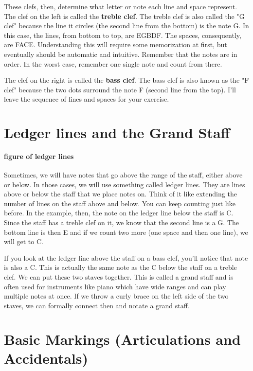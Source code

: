 \documentclass[../OpenAppliedMusicTheory.tex]{subfiles}
\begin{document}
        These clefs, then, determine what letter or note each line and space represent. The clef on the left is called the \textbf{treble clef}. The treble clef is also called the "G clef" because the line it circles (the second line from the bottom) is the note G. In this case, the lines, from bottom to top, are EGBDF. The spaces, consequently, are FACE. Understanding this will require some memorization at first, but eventually should be automatic and intuitive. Remember that the notes are in order. In the worst case, remember one single note and count from there.

        The clef on the right is called the \textbf{bass clef}. The bass clef is also known as the "F clef" because the two dots surround the note F (second line from the top). I'll leave the sequence of lines and spaces for your exercise. 

    \section{Ledger lines and the Grand Staff}\label{ch1.ledgerlines}

        \paragraph{figure of ledger lines}

        Sometimes, we will have notes that go above the range of the staff, either above or below. In those cases, we will use something called ledger lines. They are lines above or below the staff that we place notes on. Think of it like extending the number of lines on the staff above and below. You can keep counting just like before. In the example, then, the note on the ledger line below the staff is C. Since the staff has a treble clef on it, we know that the second line is a G. The bottom line is then E and if we count two more (one space and then one line), we will get to C. 

        If you look at the ledger line above the staff on a bass clef, you'll notice that note is also a C. This is actually the same note as the C below the staff on a treble clef. We can put these two staves together. This is called a grand staff and is often used for instruments like piano which have wide ranges and can play multiple notes at once. If we throw a curly brace on the left side of the two staves, we can formally connect then and notate a grand staff.

    \section{Basic Markings (Articulations and Accidentals)}
\end{document}
